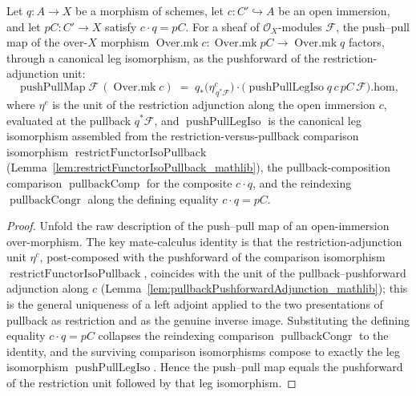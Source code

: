 \begin{lemma}
  \label{lem:pushPull_leg_coherence}
  Let \(q : A \to X\) be a morphism of schemes, let \(c : C' \hookrightarrow A\) be an open
  immersion, and let \(pC : C' \to X\) satisfy \(c \cdot q = pC\). For a sheaf of
  \(\mathcal{O}_X\)-modules \(\mathcal{F}\), the push--pull map of the over-\(X\) morphism
  \(\operatorname{Over.mk} c : \operatorname{Over.mk} pC \to \operatorname{Over.mk} q\) factors,
  through a canonical leg isomorphism, as the pushforward of the restriction-adjunction unit:
  \[
    \operatorname{pushPullMap}\mathcal{F}\,(\operatorname{Over.mk} c)
      \;=\;
    q_*\bigl(\eta^c_{\,q^*\mathcal{F}}\bigr)\cdot
      \bigl(\operatorname{pushPullLegIso} q\,c\,pC\,\mathcal{F}\bigr).\mathrm{hom},
  \]
  where \(\eta^c\) is the unit of the restriction adjunction along the open immersion \(c\),
  evaluated at the pullback \(q^*\mathcal{F}\), and \(\operatorname{pushPullLegIso}\) is the
  canonical leg isomorphism assembled from the restriction-versus-pullback comparison
  isomorphism \(\operatorname{restrictFunctorIsoPullback}\)
  (Lemma~\ref{lem:restrictFunctorIsoPullback_mathlib}), the pullback-composition comparison
  \(\operatorname{pullbackComp}\) for the composite \(c \cdot q\), and the reindexing
  \(\operatorname{pullbackCongr}\) along the defining equality \(c \cdot q = pC\).
\end{lemma}
\begin{proof}
  Unfold the raw description of the push--pull map of an open-immersion over-morphism. The key
  mate-calculus identity is that the restriction-adjunction unit \(\eta^c\), post-composed with the
  pushforward of the comparison isomorphism \(\operatorname{restrictFunctorIsoPullback}\), coincides
  with the unit of the pullback--pushforward adjunction along \(c\)
  (Lemma~\ref{lem:pullbackPushforwardAdjunction_mathlib}); this is the general uniqueness of a left
  adjoint applied to the two presentations of pullback as restriction and as the genuine inverse
  image. Substituting the defining equality \(c \cdot q = pC\) collapses the reindexing comparison
  \(\operatorname{pullbackCongr}\) to the identity, and the surviving comparison isomorphisms compose
  to exactly the leg isomorphism \(\operatorname{pushPullLegIso}\). Hence the push--pull map equals
  the pushforward of the restriction unit followed by that leg isomorphism.
\end{proof}

